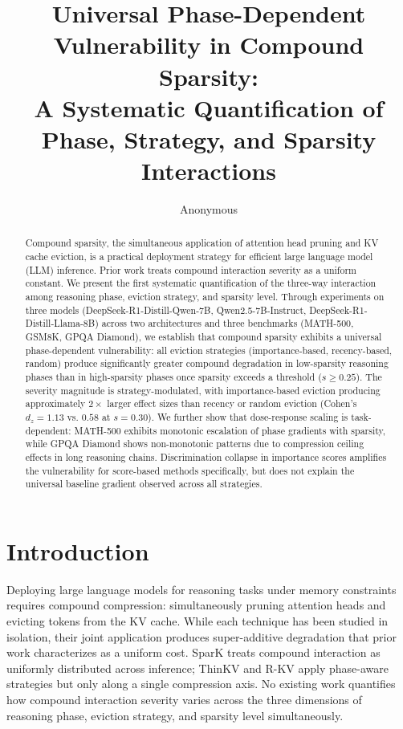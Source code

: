 \documentclass[11pt]{article}
\title{Universal Phase-Dependent Vulnerability in Compound Sparsity:\\A Systematic Quantification of Phase, Strategy, and Sparsity Interactions}
\author{Anonymous}
\date{}
\begin{document}
\maketitle

\begin{abstract}
Compound sparsity, the simultaneous application of attention head pruning and KV cache eviction, is a practical deployment strategy for efficient large language model (LLM) inference. Prior work treats compound interaction severity as a uniform constant. We present the first systematic quantification of the three-way interaction among reasoning phase, eviction strategy, and sparsity level. Through experiments on three models (DeepSeek-R1-Distill-Qwen-7B, Qwen2.5-7B-Instruct, DeepSeek-R1-Distill-Llama-8B) across two architectures and three benchmarks (MATH-500, GSM8K, GPQA Diamond), we establish that compound sparsity exhibits a universal phase-dependent vulnerability: all eviction strategies (importance-based, recency-based, random) produce significantly greater compound degradation in low-sparsity reasoning phases than in high-sparsity phases once sparsity exceeds a threshold ($s \geq 0.25$). The severity magnitude is strategy-modulated, with importance-based eviction producing approximately $2\times$ larger effect sizes than recency or random eviction (Cohen's $d_z = 1.13$ vs. $0.58$ at $s=0.30$). We further show that dose-response scaling is task-dependent: MATH-500 exhibits monotonic escalation of phase gradients with sparsity, while GPQA Diamond shows non-monotonic patterns due to compression ceiling effects in long reasoning chains. Discrimination collapse in importance scores amplifies the vulnerability for score-based methods specifically, but does not explain the universal baseline gradient observed across all strategies.
\end{abstract}

\section{Introduction}

Deploying large language models for reasoning tasks under memory constraints requires compound compression: simultaneously pruning attention heads and evicting tokens from the KV cache. While each technique has been studied in isolation, their joint application produces super-additive degradation that prior work characterizes as a uniform cost. SparK treats compound interaction as uniformly distributed across inference; ThinKV and R-KV apply phase-aware strategies but only along a single compression axis. No existing work quantifies how compound interaction severity varies across the three dimensions of reasoning phase, eviction strategy, and sparsity level simultaneously.
\end{document}
